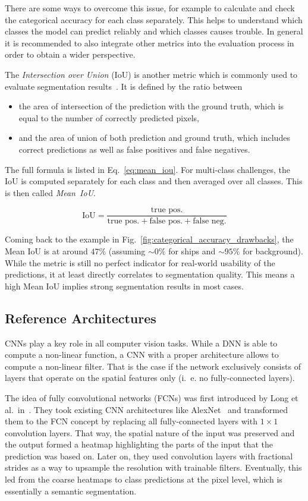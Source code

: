 There are some ways to overcome this issue, for example to calculate and check the categorical accuracy for each class separately. This helps to understand which classes the model can predict reliably and which classes causes trouble. In general it is recommended to also integrate other metrics into the evaluation process in order to obtain a wider perspective.

The \emph{Intersection over Union} (IoU) is another metric which is commonly used to evaluate segmentation results~\cite{pascal_voc15}. It is defined by the ratio between
\begin{itemize}
    \item the area of intersection of the prediction with the ground truth, which is equal to the number of correctly predicted pixels,
    \item and the area of union of both prediction and ground truth, which includes correct predictions as well as false positives and false negatives.
\end{itemize}
The full formula is listed in Eq.~\ref{eq:mean_iou}. For multi-class challenges, the IoU is computed separately for each class and then averaged over all classes. This is then called \emph{Mean~IoU}.

\begin{equation}
    \label{eq:mean_iou}
    \text{IoU} = \frac{\text{true pos.}}{\text{true pos.}+\text{false pos.}+\text{false neg.}}
\end{equation}

Coming back to the example in Fig.~\ref{fig:categorical_accuracy_drawbacks}, the Mean IoU is at around $47\%$ (assuming $\sim 0\%$ for ships and $\sim 95\%$ for background). While the metric is still no perfect indicator for real-world usability of the predictions, it at least directly correlates to segmentation quality. This means a high Mean IoU implies strong segmentation results in most cases.

\subsection{Reference Architectures}
\label{sec:ref_archs}
CNNs play a key role in all computer vision tasks. While a DNN is able to compute a non-linear function, a CNN with a proper architecture allows to compute a non-linear filter. That is the case if the network exclusively consists of layers that operate on the spatial features only (i.~e. no fully-connected layers).

The idea of fully convolutional networks (FCNs) was first introduced by Long et al.\ in~\cite{fcn15}. They took existing CNN architectures like AlexNet~\cite{alexnet12} and transformed them to the FCN concept by replacing all fully-connected layers with $1\times 1$ convolution layers. That way, the spatial nature of the input was preserved and the output formed a heatmap highlighting the parts of the input that the prediction was based on. Later on, they used convolution layers with fractional strides as a way to upsample the resolution with trainable filters. Eventually, this led from the coarse heatmaps to class predictions at the pixel level, which is essentially a semantic segmentation.

